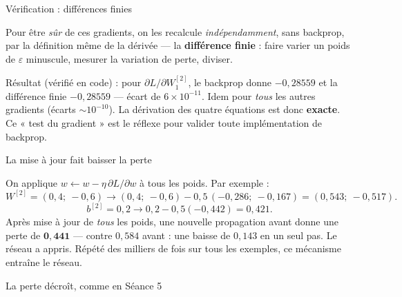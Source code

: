 \documentclass[aspectratio=169,11pt]{beamer}
\begin{document}
\begin{frame}{Vérification : différences finies}
\begin{ucadret}
{\small Pour être \emph{sûr} de ces gradients, on les recalcule \emph{indépendamment}, sans backprop, par la définition même de la dérivée — la \textbf{différence finie} : faire varier un poids de $\varepsilon$ minuscule, mesurer la variation de perte, diviser.}
\end{ucadret}
{\small Résultat (vérifié en code) : pour $\partial L/\partial W^{[2]}_1$, le backprop donne $-0{,}28559$ et la différence finie $-0{,}28559$ — écart de $6 \times 10^{-11}$. Idem pour \emph{tous} les autres gradients (écarts $\sim 10^{-10}$). La dérivation des quatre équations est donc \textbf{exacte}. Ce « test du gradient » est le réflexe pour valider toute implémentation de backprop.}
\end{frame}

\begin{frame}{La mise à jour fait baisser la perte}
\begin{ucadex}[Un pas de descente de gradient, $\eta = 0{,}5$]
{\small On applique $w \leftarrow w - \eta\,\partial L/\partial w$ à tous les poids. Par exemple :
\[ W^{[2]} = (0{,}4;\ -0{,}6) \to (0{,}4;\ -0{,}6) - 0{,}5\,(-0{,}286;\ -0{,}167) = (0{,}543;\ -0{,}517). \]
\[ b^{[2]} = 0{,}2 \to 0{,}2 - 0{,}5(-0{,}442) = 0{,}421. \]
Après mise à jour de \emph{tous} les poids, une nouvelle propagation avant donne une perte de $\mathbf{0{,}441}$ — contre $0{,}584$ avant : une baisse de $0{,}143$ en un seul pas. Le réseau a appris. Répété des milliers de fois sur tous les exemples, ce mécanisme entraîne le réseau.}
\end{ucadex}
\end{frame}

\begin{frame}{La perte décroît, comme en Séance 5}
\end{frame}
\end{document}
